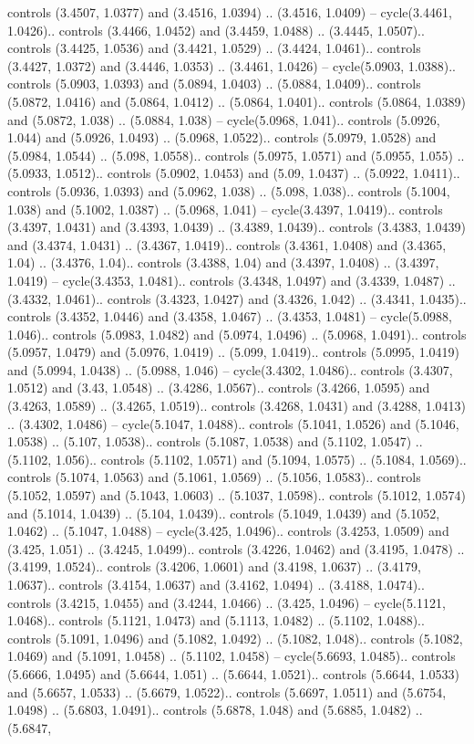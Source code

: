 controls (3.4507, 1.0377) and (3.4516, 1.0394) .. (3.4516, 1.0409) -- cycle(3.4461, 1.0426).. controls (3.4466, 1.0452) and (3.4459, 1.0488) .. (3.4445, 1.0507).. controls (3.4425, 1.0536) and (3.4421, 1.0529) .. (3.4424, 1.0461).. controls (3.4427, 1.0372) and (3.4446, 1.0353) .. (3.4461, 1.0426) -- cycle(5.0903, 1.0388).. controls (5.0903, 1.0393) and (5.0894, 1.0403) .. (5.0884, 1.0409).. controls (5.0872, 1.0416) and (5.0864, 1.0412) .. (5.0864, 1.0401).. controls (5.0864, 1.0389) and (5.0872, 1.038) .. (5.0884, 1.038) -- cycle(5.0968, 1.041).. controls (5.0926, 1.044) and (5.0926, 1.0493) .. (5.0968, 1.0522).. controls (5.0979, 1.0528) and (5.0984, 1.0544) .. (5.098, 1.0558).. controls (5.0975, 1.0571) and (5.0955, 1.055) .. (5.0933, 1.0512).. controls (5.0902, 1.0453) and (5.09, 1.0437) .. (5.0922, 1.0411).. controls (5.0936, 1.0393) and (5.0962, 1.038) .. (5.098, 1.038).. controls (5.1004, 1.038) and (5.1002, 1.0387) .. (5.0968, 1.041) -- cycle(3.4397, 1.0419).. controls (3.4397, 1.0431) and (3.4393, 1.0439) .. (3.4389, 1.0439).. controls (3.4383, 1.0439) and (3.4374, 1.0431) .. (3.4367, 1.0419).. controls (3.4361, 1.0408) and (3.4365, 1.04) .. (3.4376, 1.04).. controls (3.4388, 1.04) and (3.4397, 1.0408) .. (3.4397, 1.0419) -- cycle(3.4353, 1.0481).. controls (3.4348, 1.0497) and (3.4339, 1.0487) .. (3.4332, 1.0461).. controls (3.4323, 1.0427) and (3.4326, 1.042) .. (3.4341, 1.0435).. controls (3.4352, 1.0446) and (3.4358, 1.0467) .. (3.4353, 1.0481) -- cycle(5.0988, 1.046).. controls (5.0983, 1.0482) and (5.0974, 1.0496) .. (5.0968, 1.0491).. controls (5.0957, 1.0479) and (5.0976, 1.0419) .. (5.099, 1.0419).. controls (5.0995, 1.0419) and (5.0994, 1.0438) .. (5.0988, 1.046) -- cycle(3.4302, 1.0486).. controls (3.4307, 1.0512) and (3.43, 1.0548) .. (3.4286, 1.0567).. controls (3.4266, 1.0595) and (3.4263, 1.0589) .. (3.4265, 1.0519).. controls (3.4268, 1.0431) and (3.4288, 1.0413) .. (3.4302, 1.0486) -- cycle(5.1047, 1.0488).. controls (5.1041, 1.0526) and (5.1046, 1.0538) .. (5.107, 1.0538).. controls (5.1087, 1.0538) and (5.1102, 1.0547) .. (5.1102, 1.056).. controls (5.1102, 1.0571) and (5.1094, 1.0575) .. (5.1084, 1.0569).. controls (5.1074, 1.0563) and (5.1061, 1.0569) .. (5.1056, 1.0583).. controls (5.1052, 1.0597) and (5.1043, 1.0603) .. (5.1037, 1.0598).. controls (5.1012, 1.0574) and (5.1014, 1.0439) .. (5.104, 1.0439).. controls (5.1049, 1.0439) and (5.1052, 1.0462) .. (5.1047, 1.0488) -- cycle(3.425, 1.0496).. controls (3.4253, 1.0509) and (3.425, 1.051) .. (3.4245, 1.0499).. controls (3.4226, 1.0462) and (3.4195, 1.0478) .. (3.4199, 1.0524).. controls (3.4206, 1.0601) and (3.4198, 1.0637) .. (3.4179, 1.0637).. controls (3.4154, 1.0637) and (3.4162, 1.0494) .. (3.4188, 1.0474).. controls (3.4215, 1.0455) and (3.4244, 1.0466) .. (3.425, 1.0496) -- cycle(5.1121, 1.0468).. controls (5.1121, 1.0473) and (5.1113, 1.0482) .. (5.1102, 1.0488).. controls (5.1091, 1.0496) and (5.1082, 1.0492) .. (5.1082, 1.048).. controls (5.1082, 1.0469) and (5.1091, 1.0458) .. (5.1102, 1.0458) -- cycle(5.6693, 1.0485).. controls (5.6666, 1.0495) and (5.6644, 1.051) .. (5.6644, 1.0521).. controls (5.6644, 1.0533) and (5.6657, 1.0533) .. (5.6679, 1.0522).. controls (5.6697, 1.0511) and (5.6754, 1.0498) .. (5.6803, 1.0491).. controls (5.6878, 1.048) and (5.6885, 1.0482) .. (5.6847, 